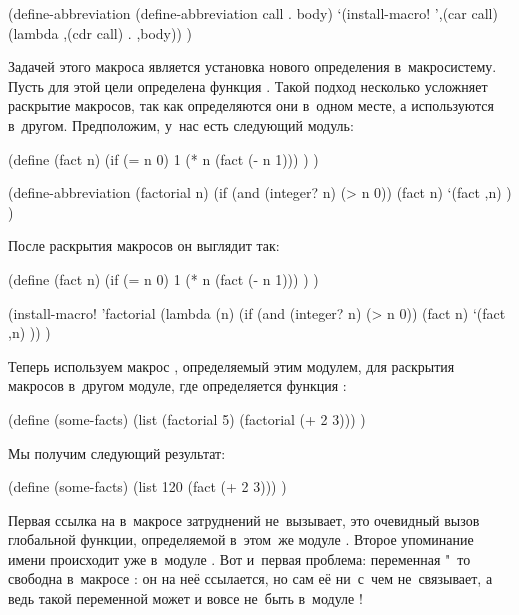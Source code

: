 \begin{code:lisp}
(define-abbreviation (define-abbreviation call . body)
  `(install-macro! ',(car call) (lambda ,(cdr call) . ,body)) )
\end{code:lisp}

Задачей этого макроса является установка нового определения в~макросистему.
Пусть для этой цели определена функция . Такой подход
несколько усложняет раскрытие макросов, так как определяются они в~одном месте,
а используются в~другом. Предположим, у~нас есть следующий модуль:


\begin{code:lisp-framed}[title={\snippet{si/chap9c.scm}}]
(define (fact n)
  (if (= n 0) 1
      (* n (fact (- n 1))) ) )

(define-abbreviation (factorial n)
  (if (and (integer? n) (> n 0))
      (fact n)
      `(fact ,n) ) )
\end{code:lisp-framed}

\noindent
После раскрытия макросов он выглядит так:

\begin{code:lisp-framed}[title={\snippet{si/chap9c.escm}}]
(define (fact n)
  (if (= n 0) 1
      (* n (fact (- n 1))) ) )

(install-macro! 'factorial
  (lambda (n) (if (and (integer? n) (> n 0))
                  (fact n)
                  `(fact ,n) )) )
\end{code:lisp-framed}

Теперь используем макрос , определяемый этим модулем, для
раскрытия макросов в~другом модуле, где определяется функция :

\begin{code:lisp-framed}[title={\snippet{si/chap9d.scm}}]
(define (some-facts)
  (list (factorial 5) (factorial (+ 2 3))) )
\end{code:lisp-framed}

\noindent
Мы получим следующий результат:

\begin{code:lisp-framed}[title={\snippet{si/chap9d.escm}}]
(define (some-facts)
  (list 120 (fact (+ 2 3))) )
\end{code:lisp-framed}

Первая ссылка на  в~макросе  затруднений не~вызывает, это
очевидный вызов глобальной функции, определяемой в~этом~же модуле
. Второе упоминание имени  происходит уже в~модуле
. Вот и~первая проблема: переменная "~то свободна
в~макросе : он на неё ссылается, но сам её ни~с~чем не~связывает,
а ведь такой переменной может и вовсе не~быть в~модуле !

